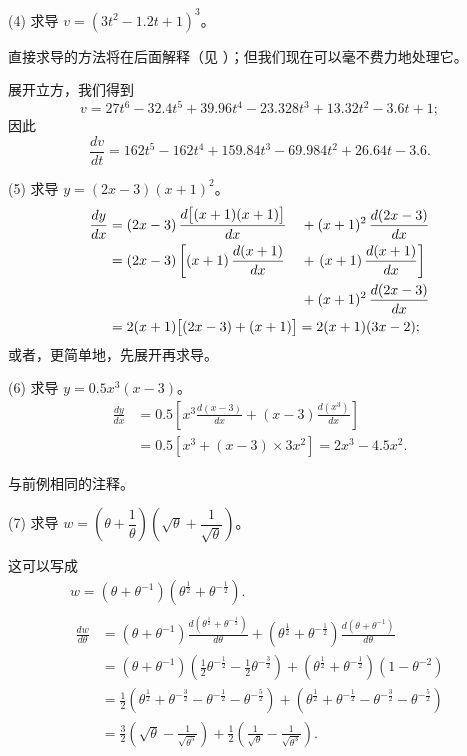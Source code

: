 \documentclass{ctexbook}
\newcommand{\DPPageSep}[2]{\Pagelabel{#2}}
\newcommand{\Pagelabel}[1]
  {\phantomsection\label{#1}}
\newcommand{\Pageref}[2][p.]{%
  \ifthenelse{\not\equal{#1}{}}{%
    \hyperref[#2]{#1~\pageref{#2}}%
  }{%
    \hyperref[#2]{\pageref{#2}}%
  }%
}
\newcommand{\efrac}[2]{\frac{#1}{#2}}
\begin{document}
(4) 求导 $v = (3t^2 - 1.2 t + 1)^3$。

直接求导的方法将在后面解释（见 \Pageref{dodge}）；但我们现在可以毫不费力地处理它。

展开立方，我们得到
\[
v = 27t^6 - 32.4t^5 + 39.96t^4 - 23.328t^3 + 13.32t^2 - 3.6t + 1; %
\]
因此
\[
\frac{dv}{dt} = 162t^5 - 162t^4 + 159.84t^3 - 69.984t^2 + 26.64t - 3.6.
\]

(5) 求导 $y = (2x - 3)(x + 1)^2$。
\begin{alignat*}{2}
\frac{dy}{dx}
  &= (2x - 3)\, \frac{d\bigl[(x + 1)(x + 1)\bigr]}{dx}
     &&+ (x + 1)^2\, \frac{d(2x - 3)}{dx} \\
  &= (2x - 3) \left[(x + 1)\, \frac{d(x + 1)}{dx}\right.
     &&+ \left.(x + 1)\, \frac{d(x + 1)}{dx}\right] \\
  &  &&+ (x + 1)^2\, \frac{d(2x - 3)}{dx} \\
  &= \rlap{$2(x + 1)\bigl[(2x - 3) + (x + 1)\bigr] = 2(x + 1)(3x - 2)$;}&&
\end{alignat*}
或者，更简单地，先展开再求导。
\DPPageSep{055.png}{43}%

(6) 求导 $y = 0.5 x^3(x-3)$。
\begin{align*}
\frac{dy}{dx}
  &= 0.5\left[x^3 \frac{d(x-3)}{dx} + (x-3) \frac{d(x^3)}{dx}\right] \\
  &= 0.5\left[x^3 + (x-3) × 3x^2\right] = 2x^3 - 4.5x^2.
\end{align*}

与前例相同的注释。

(7) 求导 $w = \left(\theta + \dfrac{1}{\theta}\right)
   \left(\sqrt{\theta} + \dfrac{1}{\sqrt{\theta}}\right)$。

这可以写成
\begin{gather*}
w = (\theta + \theta^{-1})(\theta^{\efrac{1}{2}} + \theta^{-\efrac{1}{2}}). \\
\begin{aligned}
\frac{dw}{d\theta}
  &= (\theta + \theta^{-1})
     \frac{d(\theta^{\efrac{1}{2}} + \theta^{-\efrac{1}{2}})}{d\theta}
   + (\theta^{\efrac{1}{2}} + \theta^{-\efrac{1}{2}})
     \frac{d(\theta+\theta^{-1})}{d\theta} \\
%
  &= (\theta + \theta^{-1})(\tfrac{1}{2}\theta^{-\efrac{1}{2}}
                          - \tfrac{1}{2}\theta^{-\efrac{3}{2}})
   + (\theta^{\efrac{1}{2}} + \theta^{-\efrac{1}{2}})(1 - \theta^{-2}) \\
%
  &= \tfrac{1}{2}(\theta^{ \efrac{1}{2}} + \theta^{-\efrac{3}{2}}
                - \theta^{-\efrac{1}{2}} - \theta^{-\efrac{5}{2}})
   + (\theta^{ \efrac{1}{2}} + \theta^{-\efrac{1}{2}}
    - \theta^{-\efrac{3}{2}} - \theta^{-\efrac{5}{2}}) \\%
%
  &= \tfrac{3}{2} \left(\sqrt{\theta} - \frac{1}{\sqrt{\theta^5}}\right)
   + \tfrac{1}{2} \left(\frac{1}{\sqrt{\theta}} - \frac{1}{\sqrt{\theta^3}}\right).
\end{aligned}
\end{gather*}
\end{document}
